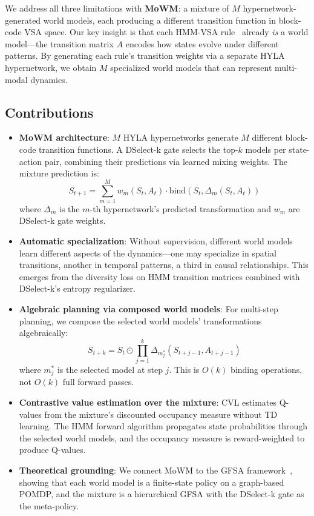 \documentclass[journal]{IEEEtai}
\begin{document}
We address all three limitations with \textbf{MoWM}: a mixture of $M$ hypernetwork-generated world models, each producing a different transition function in block-code VSA space. Our key insight is that each HMM-VSA rule~\cite{grillcheese2025hmm} already \emph{is} a world model---the transition matrix $A$ encodes how states evolve under different patterns. By generating each rule's transition weights via a separate HYLA hypernetwork, we obtain $M$ specialized world models that can represent multi-modal dynamics.

\subsection{Contributions}

\begin{itemize}
\item \textbf{MoWM architecture}: $M$ HYLA hypernetworks generate $M$ different block-code transition functions. A DSelect-k gate selects the top-$k$ models per state-action pair, combining their predictions via learned mixing weights. The mixture prediction is:
\begin{equation}
S_{t+1} = \sum_{m=1}^{M} w_m(S_t, A_t) \cdot \mathrm{bind}(S_t, \Delta_m(S_t, A_t))
\end{equation}
where $\Delta_m$ is the $m$-th hypernetwork's predicted transformation and $w_m$ are DSelect-k gate weights.

\item \textbf{Automatic specialization}: Without supervision, different world models learn different aspects of the dynamics---one may specialize in spatial transitions, another in temporal patterns, a third in causal relationships. This emerges from the diversity loss on HMM transition matrices combined with DSelect-k's entropy regularizer.

\item \textbf{Algebraic planning via composed world models}: For multi-step planning, we compose the selected world models' transformations algebraically:
\begin{equation}
S_{t+k} = S_t \odot \prod_{j=1}^{k} \Delta_{m^*_j}(S_{t+j-1}, A_{t+j-1})
\end{equation}
where $m^*_j$ is the selected model at step $j$. This is $O(k)$ binding operations, not $O(k)$ full forward passes.

\item \textbf{Contrastive value estimation over the mixture}: CVL estimates Q-values from the mixture's discounted occupancy measure without TD learning. The HMM forward algorithm propagates state probabilities through the selected world models, and the occupancy measure is reward-weighted to produce Q-values.

\item \textbf{Theoretical grounding}: We connect MoWM to the GFSA framework~\cite{johnson2020learning}, showing that each world model is a finite-state policy on a graph-based POMDP, and the mixture is a hierarchical GFSA with the DSelect-k gate as the meta-policy.
\end{itemize}
\end{document}
